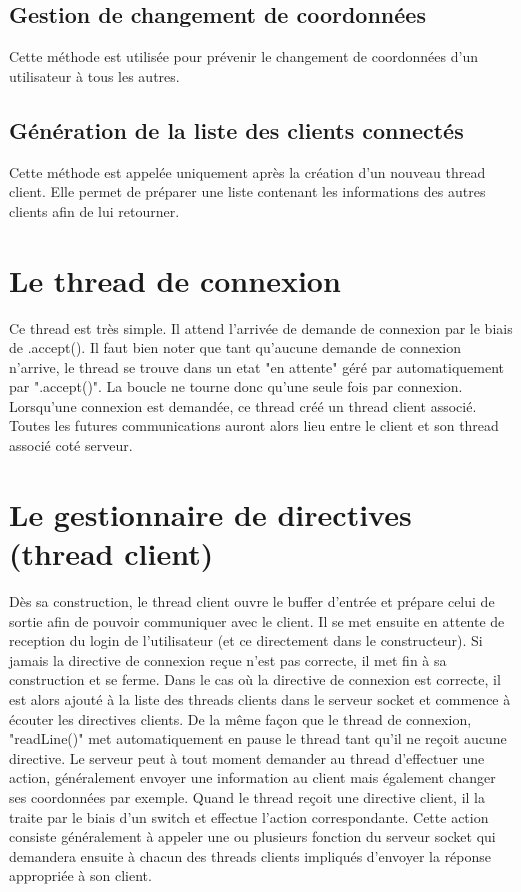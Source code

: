 \documentclass[a4paper,12pt]{report}
\begin{document}
      \subsection{Gestion de changement de coordonnées}
        \medbreak
        Cette méthode est utilisée pour prévenir le changement de coordonnées d'un utilisateur à tous les autres.

      \subsection{Génération de la liste des clients connectés}
        \medbreak
        Cette méthode est appelée uniquement après la création d'un nouveau thread client. Elle permet de préparer une liste contenant les informations des autres clients afin de lui retourner.

    \section{Le thread de connexion}
      Ce thread est très simple. Il attend l'arrivée de demande de connexion par le biais de .accept(). Il faut bien noter que tant qu'aucune demande de connexion n'arrive, le thread se trouve dans un etat "en attente" géré par automatiquement par ".accept()". La boucle ne tourne donc qu'une seule fois par connexion.
      \medbreak
      Lorsqu'une connexion est demandée, ce thread créé un thread client associé. Toutes les futures communications auront alors lieu entre le client et son thread associé coté serveur.

    \section{Le gestionnaire de directives (thread client)}
      Dès sa construction, le thread client ouvre le buffer d'entrée et prépare celui de sortie afin de pouvoir communiquer avec le client. Il se met ensuite en attente de reception du login de l'utilisateur (et ce directement dans le constructeur). Si jamais la directive de connexion reçue n'est pas correcte, il met fin à sa construction et se ferme.
      \medbreak
      Dans le cas où la directive de connexion est correcte, il est alors ajouté à la liste des threads clients dans le serveur socket et commence à écouter les directives clients. De la même façon que le thread de connexion, "readLine()" met automatiquement en pause le thread tant qu'il ne reçoit aucune directive. 
      \medbreak
      Le serveur peut à tout moment demander au thread d'effectuer une action, généralement envoyer une information au client mais également changer ses coordonnées par exemple. 
      \medbreak
      Quand le thread reçoit une directive client, il la traite par le biais d'un switch et effectue l'action correspondante. Cette action consiste généralement à appeler une ou plusieurs fonction du serveur socket qui demandera ensuite à chacun des threads clients impliqués d'envoyer la réponse appropriée à son client.
\end{document}
